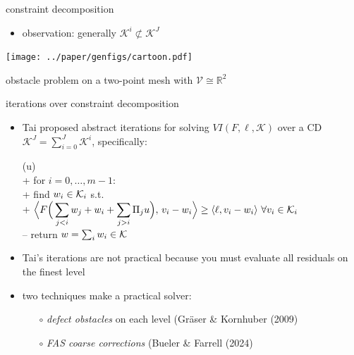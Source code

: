 \documentclass[svgnames,
               hyperref={colorlinks,citecolor=DeepPink4,linkcolor=FireBrick,urlcolor=Maroon},
               usepdftitle=false]  %
               {beamer}
\newcommand{\RR}{\mathbb{R}}
\newcommand{\ip}[2]{\left<#1,#2\right>}
\begin{document}
\begin{frame}{constraint decomposition}

\begin{itemize}
\item observation: generally $\mathcal{K}^i \not\subset \mathcal{K}^J$
\end{itemize}

\bigskip
\begin{center}
\texttt{[image: ../paper/genfigs/cartoon.pdf]}

\medskip
{\small obstacle problem on a two-point mesh with $\mathcal{V} \cong \RR^2$}
\end{center}
\end{frame}


\begin{frame}{iterations over constraint decomposition}

\begin{itemize}
\item Tai proposed abstract iterations for solving $VI(F,\ell,\mathcal{K})$ over a CD $\mathcal{K}^J = \sum_{i=0}^J \mathcal{K}^i$, specifically:

{\small
\begin{pseudo}[left-margin=-5mm]
(u)\text{:} \\+
    for $i = 0,\dots,m-1$: \\+
        find $w_i\in \mathcal{K}_i$ s.t. \\+
            $\displaystyle \Big<F\Big(\sum_{j<i} w_j + w_i + \sum_{j>i} \Pi_j u\Big),\, v_i - w_i\Big> \ge \ip{\ell}{v_i - w_i} \,\forall v_i \in \cK_i$ \\--
    return $w=\sum_i w_i\in\mathcal{K}$
\end{pseudo}
}

\item Tai's iterations are not practical because you must evaluate all residuals on the finest level
\item two techniques make a practical solver:

    \begin{itemize}
    \item[$\circ$] \emph{defect obstacles} on each level  \hfill {\scriptsize (Gr\"aser \& Kornhuber (2009)}
    \item[$\circ$] \emph{FAS coarse corrections}  \hfill {\scriptsize (Bueler \& Farrell (2024)}
    \end{itemize}
\end{itemize}
\end{frame}
\end{document}
